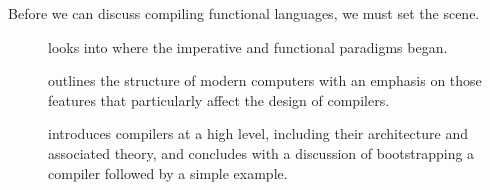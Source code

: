 
\label{background:overview}
Before we can discuss compiling functional languages, we must set the scene. 
\begin{description}
\item[] looks into where the imperative and functional paradigms began.
\item[] outlines the structure of modern computers with an emphasis on those features that particularly affect the design of compilers.
\item[] introduces compilers at a high level, including their architecture and associated theory, and concludes with a discussion of bootstrapping a compiler followed by a simple example.
\end{description}